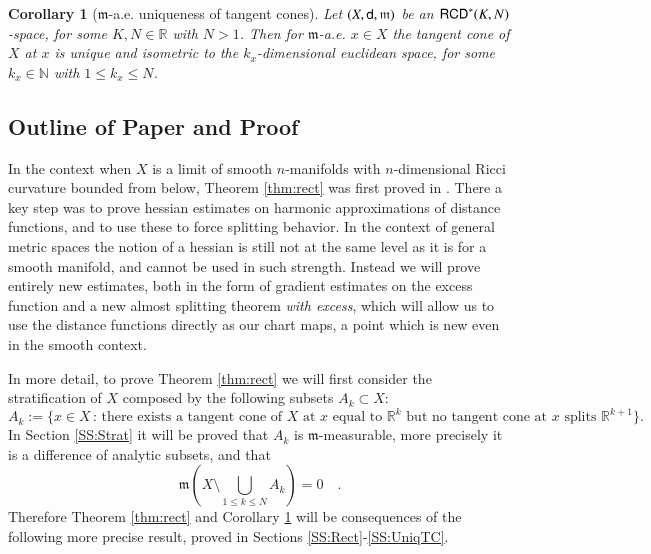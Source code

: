 \documentclass[11pt,reqno]{amsart}
\newcommand{\mm}{\mathfrak m}
\newcommand{\sfd}{{\sf d}}
\newcommand{\R}{\mathbb{R}}
\newcommand{\N}{\mathbb{N}}
\newcommand{\RCD}{{\sf RCD}}
\newtheorem{corollary}[theorem]{Corollary}
\theoremstyle{definition}
\theoremstyle{remark}
\theoremstyle{remark}
\theoremstyle{remark}
\theoremstyle{remark}
\theoremstyle{remark}
\theoremstyle{remark}
\theoremstyle{remark}
\begin{document}
\begin{corollary}[$\mm$-a.e. uniqueness of tangent cones]\label{thm:UniqTC}
Let $(X,\sfd, \mm)$ be an $\RCD^*(K,N)$-space, for some $K,N\in \R$ with $N> 1$.  Then for $\mm$-a.e. $x \in X$ the tangent cone of $X$ at $x$   is unique and isometric to the $k_x$-dimensional euclidean space, for some $k_x \in \N$ with $1\leq k_x \leq N$. 
\end{corollary}




\subsection{Outline of Paper and Proof}

In the context when $X$ is a limit of smooth $n$-manifolds with $n$-dimensional Ricci curvature bounded from below, Theorem \ref{thm:rect} was first proved in \cite{CC97}.  There a key step was to prove hessian estimates on harmonic approximations of distance functions, and to use these to force splitting behavior.  In the context of general metric spaces the notion of a hessian is still not at the same level as it is for a smooth manifold, and cannot be used in such strength.  Instead we will prove entirely new estimates, both in the form of gradient estimates on the excess function and a new almost splitting theorem {\it with excess}, which will allow us to use the distance functions directly as our chart maps, a point which is new even in the smooth context.

In more detail, to prove Theorem \ref{thm:rect} we will first consider the stratification of $X$ composed by the following subsets $A_k\subset X$:
\begin{equation}\label{eq:defAkInt}
A_k:=\{x \in X \, : \, \text{there exists a tangent cone of $X$ at $x$ equal to  } \R^k \text{ but no tangent cone at } x \text{ splits } \R^{k+1}  \}.
\end{equation}
In Section   \ref{SS:Strat} it will be proved that $A_k$ is $\mm$-measurable, more precisely it is a difference of analytic subsets, and that $$\mm\left(X\setminus  \bigcup_{1\leq k \leq N} A_k\right)=0\quad .$$ Therefore Theorem \ref{thm:rect} and Corollary \ref{thm:UniqTC} will be consequences of the following more precise result, proved in Sections \ref{SS:Rect}-\ref{SS:UniqTC}.
\end{document}
